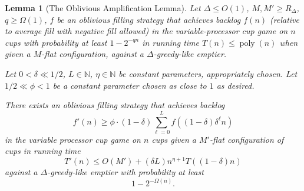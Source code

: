 \documentclass[twocolumn]{article}[10pt]
\DeclareMathOperator{\poly}{\text{poly}}
\newtheorem{lemma}{Lemma}
\begin{document}
\begin{lemma}[The Oblivious Amplification Lemma]
  \label{lem:obliviousAmplification} 
  Let $\Delta \le O(1)$, $M, M' \ge R_\Delta$, $q \ge \Omega(1)$, $f$ be an
  oblivious filling strategy that achieves backlog $f(n)$ (relative to average
  fill with negative fill allowed) in the variable-processor cup game on $n$
  cups with probability at least $1-2^{-qn}$ in running time $T(n) \le
  \poly(n)$ when given a $M$-flat configuration, against a $\Delta$-greedy-like
  emptier.

  Let $0< \delta \ll 1/2$, $L\in \mathbb{N}$, $\eta \in \mathbb{N}$ be constant
  parameters, appropriately chosen. Let $1/2 \ll \phi<1$ be a constant
  parameter chosen as close to $1$ as desired. 

  There exists an oblivious filling strategy that achieves backlog $$f'(n) \ge
  \phi \cdot (1-\delta)\sum_{\ell=0}^L f((1-\delta)\delta^\ell n)$$ in the
  variable processor cup game on $n$ cups given a $M'$-flat configuration of
  cups in running time $$T'(n) \le O(M') + (\delta L) n^{\eta+1}
  T((1-\delta)n)$$ against a $\Delta$-greedy-like emptier with probability at
  least $$1-2^{-\Omega(n)}.$$
\end{lemma}
\end{document}
